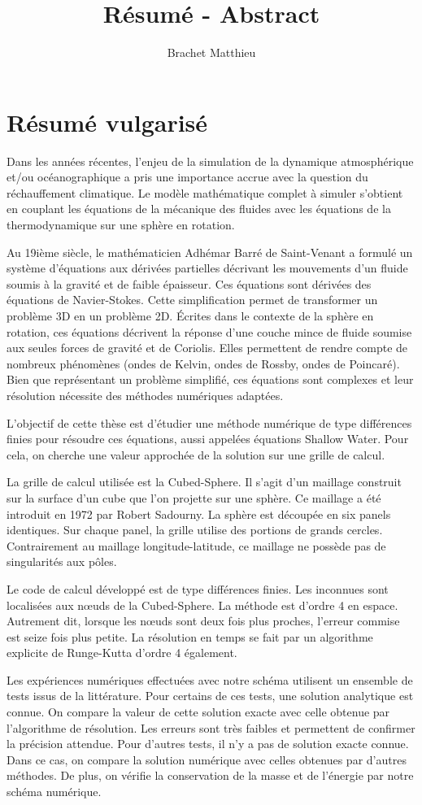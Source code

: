 \documentclass[10pt,a4paper]{article}
\author{Brachet Matthieu}
\title{Résumé - Abstract}
\begin{document}
\section{Résumé vulgarisé}

Dans les années récentes, l'enjeu de la simulation de la dynamique atmosphérique et/ou océanographique a pris une importance accrue avec la question du réchauffement climatique.
Le modèle mathématique complet à simuler s'obtient en couplant les équations de la mécanique des fluides avec les équations de la thermodynamique sur une sphère en rotation.

Au 19ième siècle, le mathématicien Adhémar Barré de Saint-Venant a formulé un système d'équations aux dérivées partielles décrivant les mouvements d'un fluide soumis à la gravité et de faible épaisseur. Ces équations sont dérivées des équations de Navier-Stokes. Cette simplification permet de transformer un problème 3D en un problème 2D. Écrites dans le contexte de la sphère en rotation, ces équations décrivent la réponse d'une couche mince de fluide soumise aux seules forces de gravité et de Coriolis. Elles permettent de rendre compte de nombreux phénomènes (ondes de Kelvin, ondes de Rossby, ondes de Poincaré). Bien que représentant un problème simplifié, ces équations sont complexes et leur résolution nécessite des méthodes numériques adaptées.

L'objectif de cette thèse est d'étudier une méthode numérique de type différences finies pour résoudre ces équations, aussi appelées équations Shallow Water. Pour cela, on cherche une valeur approchée de la solution sur une grille de calcul.

La grille de calcul utilisée est la Cubed-Sphere. Il s'agit d'un maillage construit sur la surface d'un cube que l'on projette sur une sphère. Ce maillage a été introduit en 1972 par Robert Sadourny. La sphère est découpée en six panels identiques. Sur chaque panel, la grille utilise des portions de grands cercles. Contrairement au maillage longitude-latitude, ce maillage ne possède pas de singularités aux pôles.

Le code de calcul développé est de type différences finies. Les inconnues sont localisées aux nœuds de la Cubed-Sphere. La méthode est d'ordre 4 en espace. Autrement dit, lorsque les nœuds sont deux fois plus proches, l'erreur commise est seize fois plus petite. La résolution en temps se fait par un algorithme explicite de Runge-Kutta d'ordre 4 également.

Les expériences numériques effectuées avec notre schéma utilisent un ensemble de tests issus de la littérature. Pour certains de ces tests, une solution analytique est connue. On compare la valeur de cette solution exacte avec celle obtenue par l'algorithme de résolution. Les erreurs sont très faibles et permettent de confirmer la précision attendue. Pour d'autres tests, il n'y a pas de solution exacte connue. Dans ce cas, on compare la solution numérique avec celles obtenues par d'autres méthodes. De plus, on vérifie la conservation de la masse et de l'énergie par notre schéma numérique.
\end{document}
